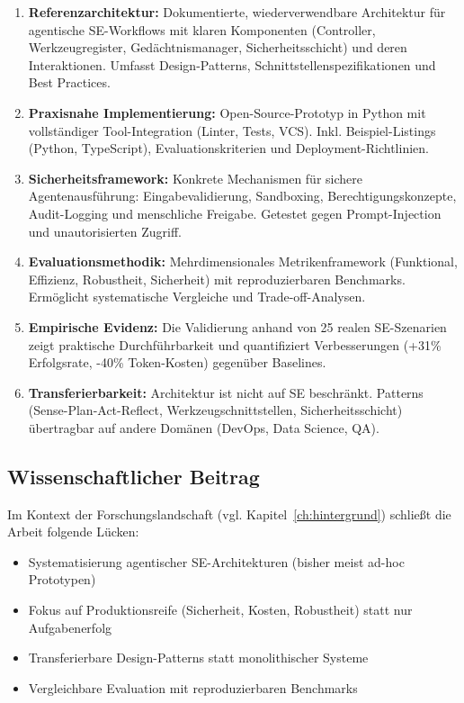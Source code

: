 \begin{enumerate}
  \item \textbf{Referenzarchitektur:} Dokumentierte, wiederverwendbare Architektur für agentische SE-Workflows mit klaren Komponenten (Controller, Werkzeugregister, Gedächtnismanager, Sicherheitsschicht) und deren Interaktionen. Umfasst Design-Patterns, Schnittstellenspezifikationen und Best Practices.
  
  \item \textbf{Praxisnahe Implementierung:} Open-Source-Prototyp in Python mit vollständiger Tool-Integration (Linter, Tests, VCS). Inkl. Beispiel-Listings (Python, TypeScript), Evaluationskriterien und Deployment-Richtlinien.
  
  \item \textbf{Sicherheitsframework:} Konkrete Mechanismen für sichere Agentenausführung: Eingabevalidierung, Sandboxing, Berechtigungskonzepte, Audit-Logging und menschliche Freigabe. Getestet gegen Prompt-Injection und unautorisierten Zugriff.
  
  \item \textbf{Evaluationsmethodik:} Mehrdimensionales Metrikenframework (Funktional, Effizienz, Robustheit, Sicherheit) mit reproduzierbaren Benchmarks. Ermöglicht systematische Vergleiche und Trade-off-Analysen.
  
  \item \textbf{Empirische Evidenz:} Die Validierung anhand von 25 realen SE-Szenarien zeigt praktische Durchführbarkeit und quantifiziert Verbesserungen (+31\% Erfolgsrate, -40\% Token-Kosten) gegenüber Baselines.
  
  \item \textbf{Transferierbarkeit:} Architektur ist nicht auf SE beschränkt. Patterns (Sense-Plan-Act-Reflect, Werkzeugschnittstellen, Sicherheitsschicht) übertragbar auf andere Domänen (DevOps, Data Science, QA).
\end{enumerate}

\subsection{Wissenschaftlicher Beitrag}

Im Kontext der Forschungslandschaft (vgl. Kapitel~\ref{ch:hintergrund}) schließt die Arbeit folgende Lücken:

\begin{itemize}
  \item Systematisierung agentischer SE-Architekturen (bisher meist ad-hoc Prototypen)
  \item Fokus auf Produktionsreife (Sicherheit, Kosten, Robustheit) statt nur Aufgabenerfolg
  \item Transferierbare Design-Patterns statt monolithischer Systeme
  \item Vergleichbare Evaluation mit reproduzierbaren Benchmarks
\end{itemize}

